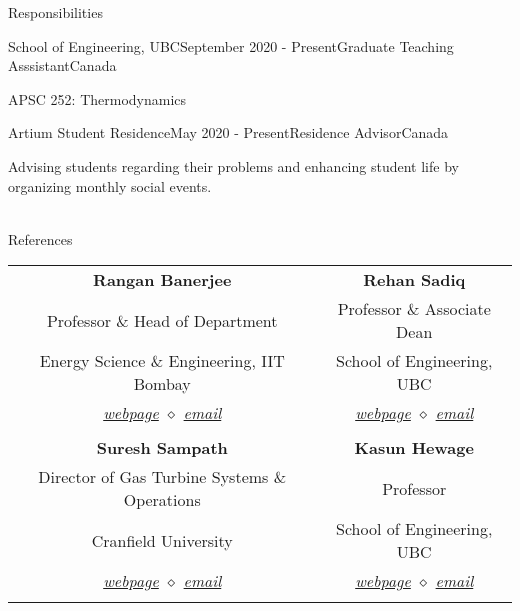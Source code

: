 \documentclass{resume} %
\begin{document}
\vspace*{-1mm}
\begin{rSection}{Responsibilities}
\begin{rSubsection}{School of Engineering, UBC}{September 2020 - Present}{Graduate Teaching Asssistant}{Canada}
\item APSC 252: Thermodynamics
\end{rSubsection}
\begin{rSubsection}{Artium Student Residence}{May 2020 - Present}{Residence Advisor}{Canada}
\item Advising students regarding their problems and enhancing student life by organizing monthly social events. \\ \\
\end{rSubsection}
\end{rSection}
\begin{rSection}{References}
\begin{center}
\begin{tabular}{cc}
\textbf{Rangan Banerjee} & \textbf{Rehan Sadiq} \\
Professor \& Head of Department & Professor \& Associate Dean  \\
Energy Science \& Engineering, IIT Bombay & School of Engineering, UBC \\
\textit{\href{http://www.ese.iitb.ac.in/~rb/}{webpage} $\diamond$ \href{mailto:rangan@iitb.ac.in}{email}}  & \textit{\href{https://engineering.ok.ubc.ca/about/contact/rehan-sadiq/}{webpage} $\diamond$ \href{mailto:Rehan.Sadiq@ubc.ca}{email}}\\
\\
\textbf{Suresh Sampath} & \textbf{Kasun Hewage} \\
Director of Gas Turbine Systems \& Operations & Professor\\
Cranfield University & School of Engineering, UBC\\
\textit{\href{https://www.cranfield.ac.uk/centres/centre-for-propulsion-engineering/turbo-electric-systems-group}{webpage} $\diamond$ \href{mailto:s.sampath@cranfield.ac.uk}{email}}  & \textit{\href{https://engineering.ok.ubc.ca/about/contact/kasun-hewage/}{webpage} $\diamond$ \href{mailto:Kasun.Hewage@ubc.ca}{email}}\\
\\

\end{tabular}
\end{center}
\vspace*{-1mm}
\end{rSection}

\end{document}
